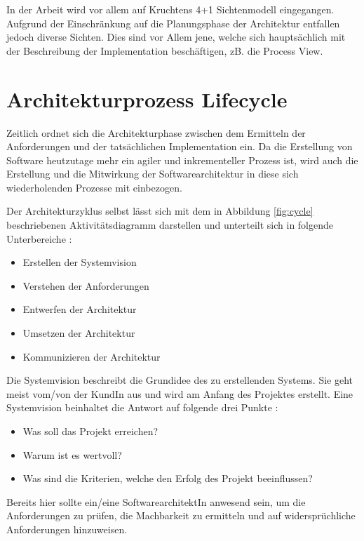In der Arbeit wird vor allem auf Kruchtens 4+1 Sichtenmodell eingegangen. Aufgrund der Einschränkung auf die Planungsphase der Architektur entfallen jedoch diverse Sichten. Dies sind vor Allem jene, welche sich hauptsächlich mit der Beschreibung der Implementation beschäftigen, zB. die Process View.

\section{Architekturprozess Lifecycle}
Zeitlich ordnet sich die Architekturphase zwischen dem Ermitteln der Anforderungen und der tatsächlichen Implementation ein. Da die Erstellung von Software heutzutage mehr ein agiler und inkrementeller Prozess ist, wird auch die Erstellung und die Mitwirkung der Softwarearchitektur in diese sich wiederholenden Prozesse mit einbezogen. \cite[S. 7]{basiswissen}

Der Architekturzyklus selbst lässt sich mit dem in Abbildung \ref{fig:cycle} beschriebenen Aktivitätsdiagramm darstellen und unterteilt sich in folgende Unterbereiche \cite[Umschlag]{softarch}:

\begin{itemize}
  \item \glqq Erstellen der Systemvision\grqq
  \item \glqq Verstehen der Anforderungen\grqq
  \item \glqq Entwerfen der Architektur\grqq
  \item \glqq Umsetzen der Architektur\grqq
  \item \glqq Kommunizieren der Architektur\grqq
\end{itemize}

Die Systemvision beschreibt die Grundidee des zu erstellenden Systems. Sie geht meist vom/von der KundIn aus und wird am Anfang des Projektes erstellt. Eine Systemvision beinhaltet die Antwort auf folgende drei Punkte \cite[S. 202-206]{vision}:

\begin{itemize}
  \item Was soll das Projekt erreichen?
  \item Warum ist es wertvoll?
  \item Was sind die Kriterien, welche den Erfolg des Projekt beeinflussen?
\end{itemize}

Bereits hier sollte ein/eine SoftwarearchitektIn anwesend sein, um die Anforderungen zu prüfen, die Machbarkeit zu ermitteln und auf widersprüchliche Anforderungen hinzuweisen. \cite[S. 352-353]{softarch}


